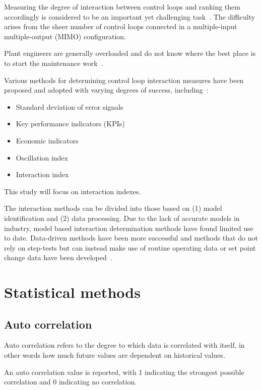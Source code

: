 Measuring the degree of interaction between control loops and ranking them accordingly is considered to be an important yet challenging task~\cite{Rahman2011}.
The difficulty arises from the sheer number of control loops connected in a multiple-input multiple-output (MIMO) configuration.

Plant engineers are generally overloaded and do not know where the best place is to start the maintenance work~\cite{Rahman2011}.

Various methods for determining control loop interaction measures have been proposed and adopted with varying degrees of success, including~\cite{Rahman2011}: %

\begin{itemize}
  \item Standard deviation of error signals
  \item Key performance indicators (KPIs) 
  \item Economic indicators
  \item Oscillation index
  \item Interaction index
\end{itemize}

This study will focus on interaction indexes. %

The interaction methods can be divided into those based on (1) model identification and (2) data processing.
Due to the lack of accurate models in industry, model based interaction determination methods have found limited use to date.
Data-driven methods have been more successful and methods that do not rely on step-tests but can instead make use of routine operating data or set point change data have been developed~\cite{Rahman2011}. %

\section{Statistical methods}

\subsection{Auto correlation}

Auto correlation refers to the degree to which data is correlated with itself, in other words how much future values are dependent on historical values. %

An auto correlation value is reported, with 1 indicating the strongest possible correlation and 0 indicating no correlation.

